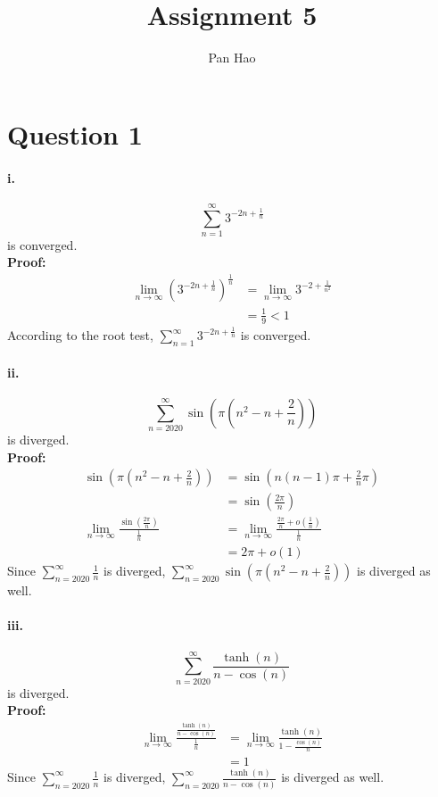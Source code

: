 \documentclass[11pt, a4paper]{article}
\begin{document}
\title{Assignment 5}
\author{Pan Hao}
\date{}
\maketitle

\section*{Question 1}
\paragraph{i.}
$$\sum\limits_{n = 1}^\infty 3^{-2n + \frac{1}{n}}$$ is converged. \\
\textbf{Proof:}
$$\begin{aligned}
    \lim\limits_{n \to \infty} (3^{-2n + \frac{1}{n}})^\frac{1}{n} &= \lim\limits_{n \to \infty} 3^{-2 + \frac{1}{n^2}} \\
    &= \frac{1}{9} < 1
\end{aligned}$$
According to the root test, $\sum\limits_{n = 1}^\infty 3^{-2n + \frac{1}{n}}$ is converged.

\paragraph{ii.}
$$\sum\limits_{n = 2020}^\infty \sin(\pi(n^2 - n + \frac{2}{n}))$$
is diverged. \\
\textbf{Proof:}
$$\begin{aligned}
    \sin(\pi(n^2 - n + \frac{2}{n})) &= \sin(n(n - 1)\pi + \frac{2}{n}\pi) \\
    &= \sin(\frac{2\pi}{n}) \\
    \lim\limits_{n \to \infty} \frac{\sin(\frac{2\pi}{n})}{\frac{1}{n}} &= \lim\limits_{n \to \infty}\frac{\frac{2\pi}{n} + o(\frac{1}{n})}{\frac{1}{n}} \\
    &= 2\pi + o(1)
\end{aligned}$$
Since $\sum\limits_{n=2020}^\infty \frac{1}{n}$ is diverged, $\sum\limits_{n = 2020}^\infty \sin(\pi(n^2 - n + \frac{2}{n}))$ is diverged as well.

\paragraph{iii.}
$$\sum\limits_{n=2020}^\infty \frac{\tanh(n)}{n - \cos(n)}$$
is diverged. \\
\textbf{Proof:}
$$\begin{aligned}
    \lim\limits_{n \to \infty} \frac{\frac{\tanh(n)}{n - \cos(n)}}{\frac{1}{n}} &= \lim\limits_{n \to \infty} \frac{\tanh(n)}{1 - \frac{\cos(n)}{n}} \\
    &= 1
\end{aligned}$$
Since $\sum\limits_{n=2020}^\infty \frac{1}{n}$ is diverged, $\sum\limits_{n=2020}^\infty \frac{\tanh(n)}{n - \cos(n)}$ is diverged as well.
\end{document}
